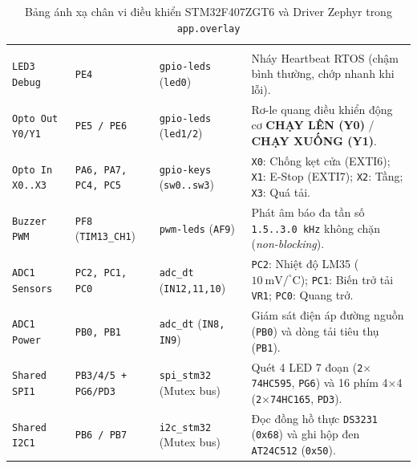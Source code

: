 \begingroup
\renewcommand{\arraystretch}{1.12}%
\setlength{\tabcolsep}{4.5pt}%
\fontsize{8.1}{10.1}\selectfont
{}%
\begin{xltabular}{\textwidth}{|L{2.6cm}|L{2.8cm}|L{3.0cm}|Y|}
\caption{Bảng ánh xạ chân vi điều khiển STM32F407ZGT6 và Driver Zephyr trong \texttt{app.overlay}}\label{tab:pinmap}\\
\hline
{}
 &  &  &  \\
\hline
\endfirsthead
\hline
{}
 &  &  &  \\
\hline
\endhead
\hline
\endfoot
\hline
\endlastfoot
\texttt{LED3 Debug} & \texttt{PE4} & \texttt{gpio-leds} (\texttt{led0}) & Nháy Heartbeat RTOS (chậm bình thường, chớp nhanh khi lỗi). \\
\hline
{}
\texttt{Opto Out Y0/Y1} & \texttt{PE5 / PE6} & \texttt{gpio-leds} (\texttt{led1/2}) & Rơ-le quang điều khiển động cơ \textbf{CHẠY LÊN (Y0)} / \textbf{CHẠY XUỐNG (Y1)}. \\
\hline
\texttt{Opto In X0..X3} & \texttt{PA6, PA7, PC4, PC5} & \texttt{gpio-keys} (\texttt{sw0..sw3}) & \texttt{X0}: Chống kẹt cửa (EXTI6); \texttt{X1}: E-Stop (EXTI7); \texttt{X2}: Tầng; \texttt{X3}: Quá tải. \\
\hline
{}
\texttt{Buzzer PWM} & \texttt{PF8} (\texttt{TIM13\_CH1}) & \texttt{pwm-leds} (\texttt{AF9}) & Phát âm báo đa tần số \texttt{1.5..3.0 kHz} không chặn (\textit{non-blocking}). \\
\hline
\texttt{ADC1 Sensors} & \texttt{PC2, PC1, PC0} & \texttt{adc\_dt} (\texttt{IN12,11,10}) & \texttt{PC2}: Nhiệt độ LM35 ($10~\text{mV}/^\circ\text{C}$); \texttt{PC1}: Biến trở tải \texttt{VR1}; \texttt{PC0}: Quang trở. \\
\hline
{}
\texttt{ADC1 Power} & \texttt{PB0, PB1} & \texttt{adc\_dt} (\texttt{IN8, IN9}) & Giám sát điện áp đường nguồn (\texttt{PB0}) và dòng tải tiêu thụ (\texttt{PB1}). \\
\hline
\texttt{Shared SPI1} & \texttt{PB3/4/5 + PG6/PD3} & \texttt{spi\_stm32} (Mutex bus) & Quét 4 LED 7 đoạn (\texttt{2$\times$74HC595}, \texttt{PG6}) và 16 phím 4$\times$4 (\texttt{2$\times$74HC165}, \texttt{PD3}). \\
\hline
{}
\texttt{Shared I2C1} & \texttt{PB6 / PB7} & \texttt{i2c\_stm32} (Mutex bus) & Đọc đồng hồ thực \texttt{DS3231} (\texttt{0x68}) và ghi hộp đen \texttt{AT24C512} (\texttt{0x50}). \\

\end{xltabular}
